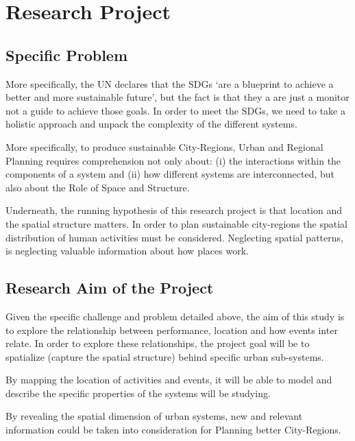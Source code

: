 \section{Research Project}
\subsection{Specific Problem}
More specifically, the UN declares that the SDGs ‘are a blueprint to achieve a better and more sustainable future’, but the fact is that they a are just a monitor not a guide to achieve those goals. In order to meet the SDGs, we need to take a holistic approach and unpack the complexity of the different systems. \par

More specifically, to produce sustainable City-Regions, Urban and Regional Planning requires comprehension not only about: (i) the interactions within the components of a system and (ii) how different systems are interconnected, but also about the Role of Space and Structure.\par

Underneath, the running hypothesis of this research project is that location and the spatial structure matters. In order to plan sustainable city-regions the spatial distribution of human activities must be considered. Neglecting spatial patterns, is neglecting valuable information about how places work. 

\subsection{Research Aim of the Project}
Given the specific challenge and problem detailed above, the aim of this study is to explore the relationship between performance, location and how events inter relate.
In order to explore these relationships, the project goal will be to spatialize (capture the spatial structure) behind specific urban sub-systems. \par

By mapping the location of activities and events, it will be able to model and describe the specific properties of the systems will be studying. \par

By revealing the spatial dimension of urban systems, new and relevant information could be taken into consideration for Planning better City-Regions. 
